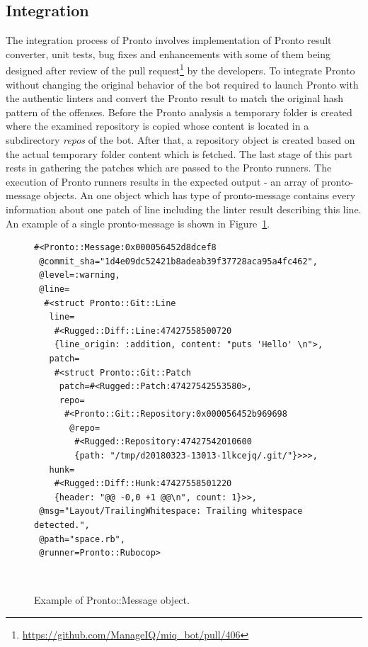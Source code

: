 \subsection{Integration}

The integration process of Pronto involves implementation of Pronto result converter, unit tests, bug fixes and enhancements with some of them being designed after review of the pull request\footnote{\url{https://github.com/ManageIQ/miq_bot/pull/406}} by the developers. To integrate Pronto without changing the original behavior of the bot required to launch Pronto with the authentic linters and convert the Pronto result to match the original hash pattern of the offenses. Before the Pronto analysis a temporary folder is created where the examined repository is copied whose content is located in a subdirectory \textit{repos} of the bot. After that, a repository object is created based on the actual temporary folder content which is fetched. The last stage of this part rests in gathering the patches which are passed to the Pronto runners. The execution of Pronto runners results in the expected output - an array of pronto-message objects. An one object which has type of pronto-message contains every information about one patch of line including the linter result describing this line. An example of a single pronto-message is shown in Figure~\ref{fig:pronto_message}.

\begin{figure}[H]
\begin{lstlisting}[basicstyle=\scriptsize, xleftmargin=.21\textwidth]
#<Pronto::Message:0x000056452d8dcef8
 @commit_sha="1d4e09dc52421b8adeab39f37728aca95a4fc462",
 @level=:warning,
 @line=
  #<struct Pronto::Git::Line
   line=
    #<Rugged::Diff::Line:47427558500720
    {line_origin: :addition, content: "puts 'Hello' \n">,
   patch=
    #<struct Pronto::Git::Patch
     patch=#<Rugged::Patch:47427542553580>,
     repo=
      #<Pronto::Git::Repository:0x000056452b969698
       @repo=
        #<Rugged::Repository:47427542010600
        {path: "/tmp/d20180323-13013-1lkcejq/.git/"}>>>,
   hunk=
    #<Rugged::Diff::Hunk:47427558501220
    {header: "@@ -0,0 +1 @@\n", count: 1}>>,
 @msg="Layout/TrailingWhitespace: Trailing whitespace detected.",
 @path="space.rb",
 @runner=Pronto::Rubocop>
\end{lstlisting}
\hfill\\[-3em]
\caption{Example of Pronto::Message object.}
\label{fig:pronto_message}
\end{figure}

